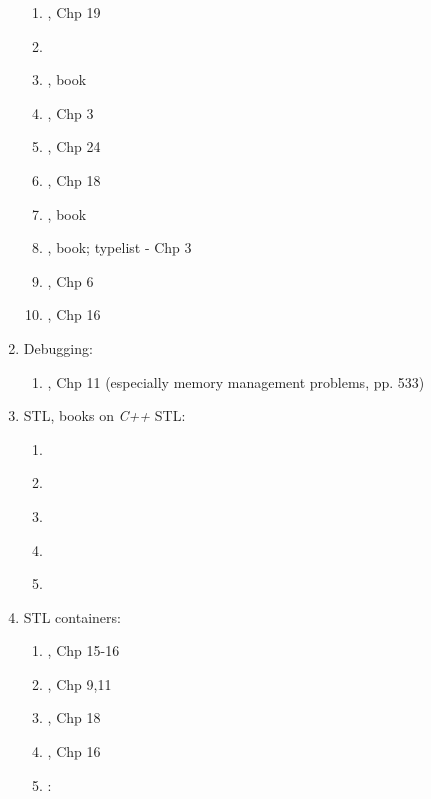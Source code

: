 \begin{enumerate}
\begin{enumerate}
	\item \cite{Stroustrup2009}, Chp 19
	\item \cite[\S6.16, pp. 193--195]{Pozrikidis2007}
	\item \cite{Abrahams2005}, book
	\item \cite{Eckel2003}, Chp 3
	\item \cite{Oualline2003}, Chp 24
	\item \cite{Schildt2003}, Chp 18
	\item \cite{Vandevoorde2003}, book
	\item \cite{Alexandrescu2001}, book; typelist - Chp 3
	\item \cite{Vermeir2001}, Chp 6
	\item \cite{Eckel2000}, Chp 16
	\end{enumerate}
\item Debugging: \vspace{-0.3cm}
	\begin{enumerate} \itemsep -2pt
	\item \cite{Eckel2003}, Chp 11 (especially memory management problems, pp. 533)
	\end{enumerate}
\item STL, books on {\it C++} STL: \vspace{-0.3cm}
	\begin{enumerate} \itemsep -2pt
	\item \cite{Josuttis2012}
	\item \cite[Chp. 18, pp. 943--998]{Savitch2009}
	\item \cite{Reese2006a}
	\item \cite{Robson2000}
	\item \cite{Josuttis1999a}
	\end{enumerate}
\item STL containers: \vspace{-0.3cm}
	\begin{enumerate} \itemsep -2pt
	\item \cite{Gregoire2014}, Chp 15-16
	\item \cite{Lippman2013}, Chp 9,11
	\item \cite{Allain2012}, Chp 18
	\item \cite{Prata2012}, Chp 16
	\item \cite{EliteHussar2010}: \vspace{-0.2cm}
		\begin{enumerate} \itemsep -2pt

\end{enumerate}
\end{enumerate}
\end{enumerate}
